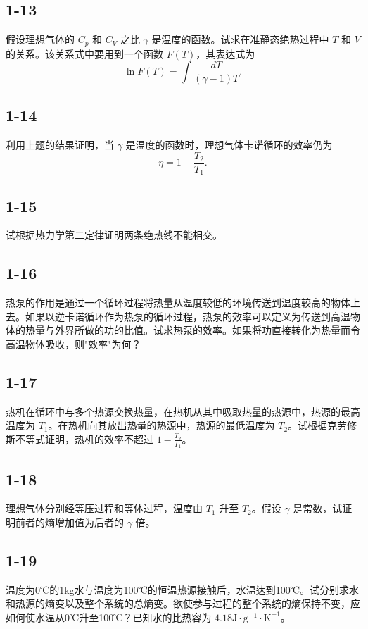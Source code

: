 \newpage
\subsection{1-13}
假设理想气体的 $C_p$ 和 $C_V$ 之比 $\gamma$ 是温度的函数。试求在准静态绝热过程中 $T$ 和 $V$ 的关系。该关系式中要用到一个函数 $F(T)$，其表达式为
$$\ln F(T) = \int \frac{dT}{(\gamma - 1)T}.$$

\newpage
\subsection{1-14}
利用上题的结果证明，当 $\gamma$ 是温度的函数时，理想气体卡诺循环的效率仍为
$$\eta = 1 - \frac{T_2}{T_1}.$$

\newpage
\subsection{1-15}
试根据热力学第二定律证明两条绝热线不能相交。

\newpage
\subsection{1-16}
热泵的作用是通过一个循环过程将热量从温度较低的环境传送到温度较高的物体上去。如果以逆卡诺循环作为热泵的循环过程，热泵的效率可以定义为传送到高温物体的热量与外界所做的功的比值。试求热泵的效率。如果将功直接转化为热量而令高温物体吸收，则"效率"为何？

\newpage
\subsection{1-17}
热机在循环中与多个热源交换热量，在热机从其中吸取热量的热源中，热源的最高温度为 $T_1$。在热机向其放出热量的热源中，热源的最低温度为 $T_2$。试根据克劳修斯不等式证明，热机的效率不超过 $1 - \frac{T_2}{T_1}$。

\newpage
\subsection{1-18}
理想气体分别经等压过程和等体过程，温度由 $T_1$ 升至 $T_2$。假设 $\gamma$ 是常数，试证明前者的熵增加值为后者的 $\gamma$ 倍。

\newpage
\subsection{1-19}
温度为0℃的1kg水与温度为100℃的恒温热源接触后，水温达到100℃。试分别求水和热源的熵变以及整个系统的总熵变。欲使参与过程的整个系统的熵保持不变，应如何使水温从0℃升至100℃？已知水的比热容为 $4.18 \mathrm{J \cdot g^{-1} \cdot K^{-1}}$。

